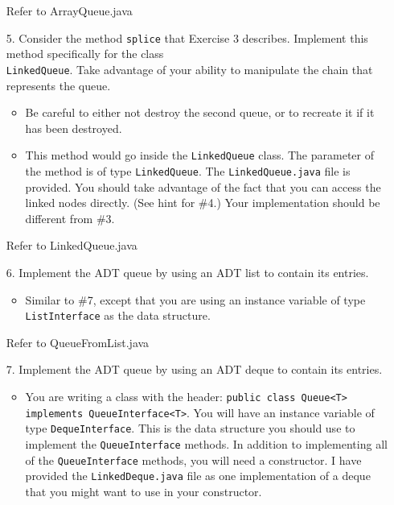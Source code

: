 \documentclass[10pt]{article}
\begin{document}
\begin{enumerate}
			\vspace{0.5cm}
			Refer to ArrayQueue.java
			\vspace{0.5cm}
		
		\item[5.] Consider the method \texttt{splice} that Exercise 3 describes. Implement this method specifically for the class\\ \texttt{LinkedQueue}. Take advantage of your ability to manipulate the chain that represents the queue.
			
			\begin{itemize}
				\item Be careful to either not destroy the second queue, or to recreate it if it has been destroyed.
				\item This method would go inside the \texttt{LinkedQueue} class. The parameter of the method is of type \texttt{LinkedQueue}. The \texttt{LinkedQueue.java} file is provided. You should take advantage of the fact that you can access the linked nodes directly. (See hint for \#4.) Your implementation should be different from \#3.
			\end{itemize}
			
			\vspace{0.5cm}
			Refer to LinkedQueue.java
			\vspace{0.5cm}
		
		\item[6.] Implement the ADT queue by using an ADT list to contain its entries.
			
			\begin{itemize}
				\item Similar to \#7, except that you are using an instance variable of type \texttt{ListInterface} as the data structure.
			\end{itemize}
			
			\vspace{0.5cm}
			Refer to QueueFromList.java
			\vspace{0.5cm}
		
		\item[7.] Implement the ADT queue by using an ADT deque to contain its entries.
			
			\begin{itemize}
				\item You are writing a class with the header: \texttt{public class Queue<T> implements QueueInterface<T>}. You will have an instance variable of type \texttt{DequeInterface}. This is the data structure you should use to implement the \texttt{QueueInterface} methods. In addition to implementing all of the \texttt{QueueInterface} methods, you will need a constructor. I have provided the \texttt{LinkedDeque.java} file as one implementation of a deque that you might want to use in your constructor.
			\end{itemize}
			

\end{enumerate}
\end{document}
